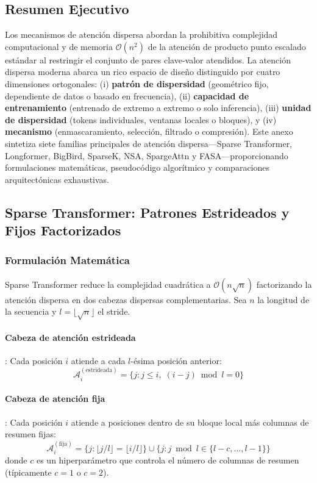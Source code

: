 \documentclass[11pt,a4paper]{article}
\begin{document}
\subsection{Resumen Ejecutivo}

Los mecanismos de atención dispersa abordan la prohibitiva complejidad computacional y de memoria $\mathcal{O}(n^2)$ de la atención de producto punto escalado estándar al restringir el conjunto de pares clave-valor atendidos. La atención dispersa moderna abarca un rico espacio de diseño distinguido por cuatro dimensiones ortogonales: (i) \textbf{patrón de dispersidad} (geométrico fijo, dependiente de datos o basado en frecuencia), (ii) \textbf{capacidad de entrenamiento} (entrenado de extremo a extremo o solo inferencia), (iii) \textbf{unidad de dispersidad} (tokens individuales, ventanas locales o bloques), y (iv) \textbf{mecanismo} (enmascaramiento, selección, filtrado o compresión). Este anexo sintetiza siete familias principales de atención dispersa---Sparse Transformer, Longformer, BigBird, SparseK, NSA, SpargeAttn y FASA---proporcionando formulaciones matemáticas, pseudocódigo algorítmico y comparaciones arquitectónicas exhaustivas.

\subsection{Sparse Transformer: Patrones Estrideados y Fijos Factorizados}

\subsubsection{Formulación Matemática}

Sparse Transformer \citep{child_sparse_transformer_2019} reduce la complejidad cuadrática a $\mathcal{O}(n\sqrt{n})$ factorizando la atención dispersa en dos cabezas dispersas complementarias. Sea $n$ la longitud de la secuencia y $l = \lfloor\sqrt{n}\rfloor$ el stride.

\paragraph{Cabeza de atención estrideada}: Cada posición $i$ atiende a cada $l$-ésima posición anterior:
\[
\mathcal{A}_i^{(\text{estrideada})} = \{j : j \leq i,\; (i - j) \bmod l = 0\}
\]

\paragraph{Cabeza de atención fija}: Cada posición $i$ atiende a posiciones dentro de su bloque local más columnas de resumen fijas:
\[
\mathcal{A}_i^{(\text{fija})} = \{j : \lfloor j/l \rfloor = \lfloor i/l \rfloor\} \cup \{j : j \bmod l \in \{l-c, \ldots, l-1\}\}
\]
donde $c$ es un hiperparámetro que controla el número de columnas de resumen (típicamente $c=1$ o $c=2$).
\end{document}
